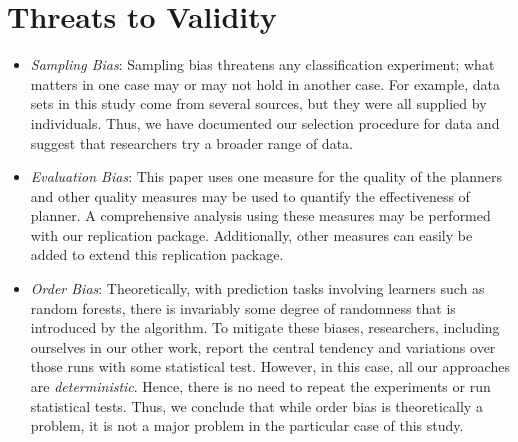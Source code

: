 \section{Threats to Validity}
\label{sect:threats}
\begin{itemize}[leftmargin=-1pt]
\item[] \textit{Sampling Bias}: Sampling bias threatens any classification experiment;
what matters in one case may or may not hold in another case. 
For example, data sets in this study come from several sources, but they were all supplied by individuals. Thus, we have documented our selection procedure for data and suggest that researchers
try a broader range of data.
\item[] \textit{Evaluation Bias}:
This paper uses one measure for the quality of the planners
and other quality measures may be used to quantify the effectiveness of planner. A comprehensive analysis using these measures may be performed with our replication package. Additionally, other measures can easily be added to extend this replication package.

\item[] \textit{Order Bias}: 
Theoretically, with prediction tasks involving learners such as random forests, there is invariably some degree of randomness that is introduced by the algorithm. To mitigate these biases, researchers, including ourselves in our other work, report the central tendency and variations over those runs with some statistical test. However, in this case, all our approaches are \textit{deterministic}. Hence, there is no need to repeat the experiments or run statistical tests. Thus, we conclude that while order bias is theoretically a problem, 
it is not a major problem in the particular case of this study.
\end{itemize}

